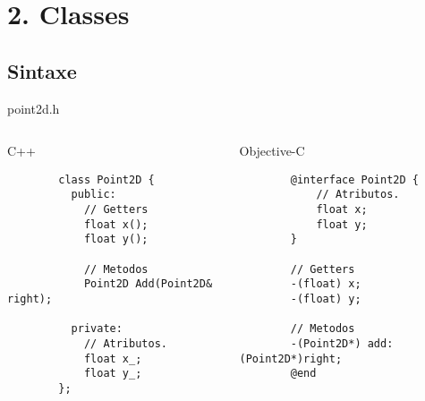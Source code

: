 \documentclass[brazil]{beamer}
\begin{document}
\section{2. Classes}

\subsection{Sintaxe}

\begin{frame}[fragile]
  point2d.h
  \begin{columns}
    \begin{column}{.5\textwidth}
      \begin{center}
        C++
      \end{center}
      \lstset{language=C++,basicstyle=\tiny}
      \begin{lstlisting}
        class Point2D {
          public:
            // Getters
            float x();
            float y();

            // Metodos
            Point2D Add(Point2D& right);

          private:
            // Atributos.
            float x_;
            float y_;
        };
      \end{lstlisting}
    \end{column}
    \begin{column}{.5\textwidth}
      \begin{center}
        Objective-C
      \end{center}
      \lstset{language=C++,basicstyle=\tiny}
      \begin{lstlisting}
        @interface Point2D {
            // Atributos.
            float x;
            float y;
        }

        // Getters
        -(float) x;
        -(float) y;
        
        // Metodos
        -(Point2D*) add: (Point2D*)right;
        @end
      \end{lstlisting}
    \end{column}
  \end{columns}
\end{frame}
\end{document}
